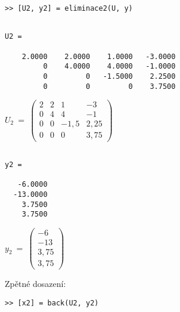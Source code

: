 \documentclass[a4paper,10pt]{article}
\begin{document}
\begin{verbatim}
>> [U2, y2] = eliminace2(U, y)
\end{verbatim}

\begin{minipage}[t]{.5\textwidth}
\begin{verbatim}

U2 =

    2.0000    2.0000    1.0000   -3.0000
         0    4.0000    4.0000   -1.0000
         0         0   -1.5000    2.2500
         0         0         0    3.7500

\end{verbatim}
\end{minipage}%
\begin{minipage}[t]{.5\textwidth}

\bigskip
\bigskip

$
U_2~=~
\left( \begin{array}{rrrr}
2 &  2 &  1   & -3 \\
0 &  4 &  4   & -1 \\
0 &  0 & -1,5 &  2,25 \\
0 &  0 &  0   &  3,75 
\end{array} \right)
$
\vfill
\end{minipage}

\begin{minipage}[t]{.5\textwidth}
\begin{verbatim}

y2 =

   -6.0000
  -13.0000
    3.7500
    3.7500

\end{verbatim}
\end{minipage}%
\begin{minipage}[t]{.5\textwidth}

\bigskip
\bigskip

$
y_2~=~
\left( \begin{array}{r}
 -6 \\
-13 \\
  3,75 \\
  3,75
\end{array} \right)
$
\vfill
\end{minipage}

\newpage
\par Zpětné dosazení:

\begin{verbatim}
>> [x2] = back(U2, y2)
\end{verbatim}
\end{document}
